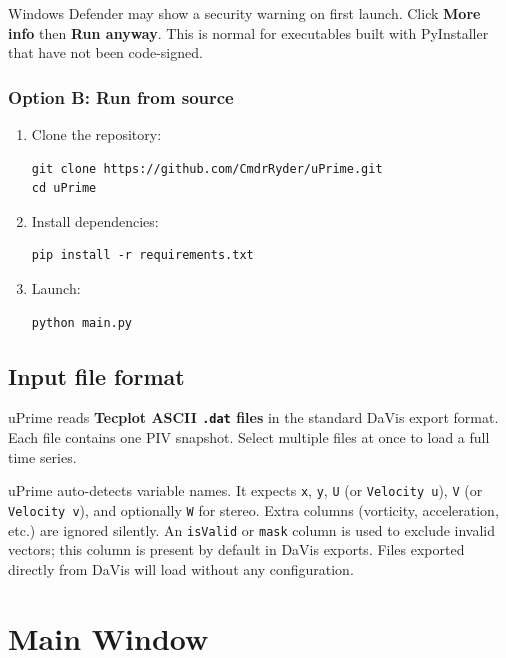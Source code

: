 \documentclass[11pt, a4paper]{report}
\begin{document}
\begin{notebox}
Windows Defender may show a security warning on first launch. Click \textbf{More info} then \textbf{Run anyway}. This is normal for executables built with PyInstaller that have not been code-signed.
\end{notebox}

\subsection{Option B: Run from source}

\begin{enumerate}[leftmargin=1.5em]
  \item Clone the repository:
\begin{verbatim}
git clone https://github.com/CmdrRyder/uPrime.git
cd uPrime
\end{verbatim}
  \item Install dependencies:
\begin{verbatim}
pip install -r requirements.txt
\end{verbatim}
  \item Launch:
\begin{verbatim}
python main.py
\end{verbatim}
\end{enumerate}

\section{Input file format}

uPrime reads \textbf{Tecplot ASCII \texttt{.dat} files} in the standard DaVis export format. Each file contains one PIV snapshot. Select multiple files at once to load a full time series.

\begin{notebox}
uPrime auto-detects variable names. It expects \texttt{x}, \texttt{y}, \texttt{U} (or \texttt{Velocity u}), \texttt{V} (or \texttt{Velocity v}), and optionally \texttt{W} for stereo. Extra columns (vorticity, acceleration, etc.) are ignored silently. An \texttt{isValid} or \texttt{mask} column is used to exclude invalid vectors; this column is present by default in DaVis exports. Files exported directly from DaVis will load without any configuration.
\end{notebox}

\chapter{Main Window}
\label{ch:main}
\end{document}

